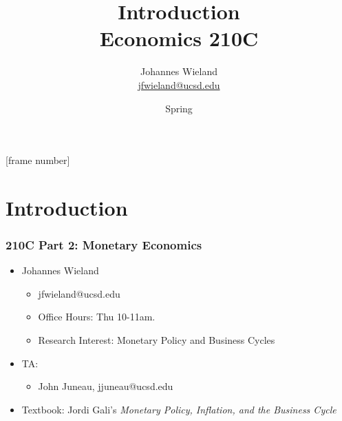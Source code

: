 \documentclass[english,xcolor=svgnames]{beamer}
\begin{document}
\title{Introduction \\ Economics 210C}
\vspace{1cm}
\author[shortname]{
\begin{tabular}{c}
	Johannes Wieland \\ 
	\footnotesize \href{mailto:jfwieland@ucsd.edu}{jfwieland@ucsd.edu}  \\ 
\end{tabular}
}

\date{Spring \the\year}

\makebeamertitle
{}[frame number]{}

\addtocounter{framenumber}{-1}

\section{Introduction}



\begin{frame}
\frametitle{210C Part 2: Monetary Economics}
\begin{itemize}
	\item Johannes Wieland
	\begin{itemize}
		\item jfwieland@ucsd.edu
		\item Office Hours: Thu 10-11am.
		\item Research Interest: Monetary Policy and Business Cycles
	\end{itemize}
	\item TA:
	\begin{itemize}
		\item John Juneau, jjuneau@ucsd.edu
	\end{itemize}
	\item Textbook: Jordi Gali's \emph{Monetary Policy, Inflation, and the Business Cycle}
\end{itemize}
\end{frame}
\end{document}
